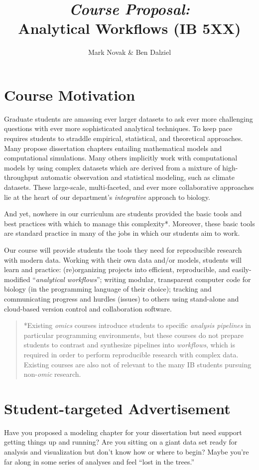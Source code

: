 \documentclass[10pt]{article}
\author{Mark Novak \& Ben Dalziel}
\title{\emph{Course Proposal:}\\Analytical Workflows (IB 5XX)}
\date{}
\begin{document}
\maketitle

\section*{Course Motivation}
Graduate students are amassing ever larger datasets to ask ever more challenging questions with ever more sophisticated  analytical techniques. To keep pace requires students to straddle empirical, statistical, and theoretical approaches. Many propose dissertation chapters entailing mathematical models and computational simulations.  Many others implicitly work with computational models by using complex datasets which are derived from a mixture of high-throughput automatic observation and statistical modeling, such as climate datasets. These large-scale, multi-faceted, and ever more collaborative approaches lie at the heart of our department's \emph{integrative} approach to biology.  

And yet, nowhere in our curriculum are students provided the basic tools and best practices with which to manage this complexity*. Moreover, these basic tools are standard practice in many of the jobs in which our students aim to work.

Our course will provide students the tools they need for reproducible research with modern data.  Working with their own data and/or models, students will learn and practice: (re)organizing projects into efficient, reproducible, and easily-modified ``\emph{analytical workflows}''; writing modular, transparent computer code for biology (in the programming language of their choice); tracking and communicating progress and hurdles (issues) to others using stand-alone and cloud-based version control and collaboration software.

\begin{quote}
	*Existing \emph{omics} courses introduce students to specific \emph{analysis pipelines} in particular programming environments, but these courses do not prepare students to contrast and synthesize pipelines into \emph{workflows}, which is required in order to perform reproducible research with complex data. Existing courses are also not of relevant to the many IB students pursuing non-\emph{omic} research.
\end{quote}


\section*{Student-targeted Advertisement}
Have you proposed a modeling chapter for your dissertation but need support getting things up and running?  Are you sitting on a giant data set ready for analysis and visualization but don't know how or where to begin?  Maybe you're far along in some series of analyses and feel ``lost in the trees.''
\end{document}
